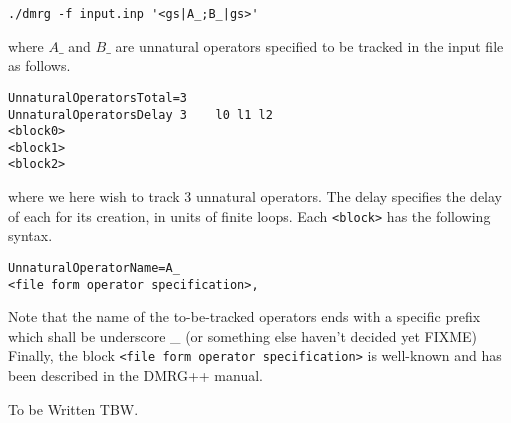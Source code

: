 \documentclass{article}
\begin{document}
\begin{verbatim}
./dmrg -f input.inp '<gs|A_;B_|gs>'
\end{verbatim}
where $A\_$ and $B\_$ are unnatural operators specified to be
tracked in the input file as follows.
\begin{verbatim}
UnnaturalOperatorsTotal=3
UnnaturalOperatorsDelay 3    l0 l1 l2
<block0>
<block1>
<block2>
\end{verbatim}
where we here wish to track 3 unnatural operators. 
The delay specifies the delay of each for its creation, in units
of finite loops.
Each \texttt{<block>} has the following syntax.
\begin{verbatim}
UnnaturalOperatorName=A_
<file form operator specification>,
\end{verbatim}
Note that the name of the to-be-tracked operators ends
 with a specific prefix which shall be underscore \_
(or something else haven't
decided yet FIXME)
Finally, the block \texttt{<file form operator specification>} is well-known
and has been described in the DMRG++ manual.

To be Written TBW.
\end{document}
